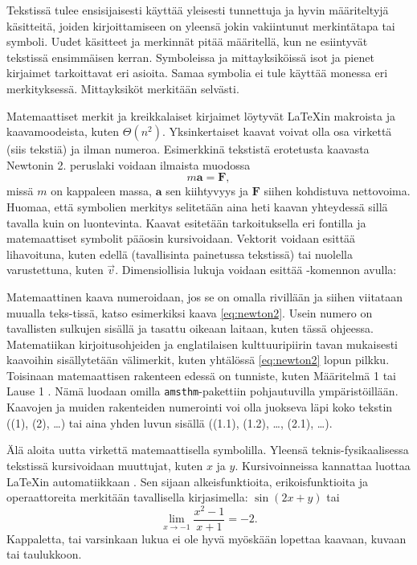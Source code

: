 Tekstissä tulee ensisijaisesti käyttää yleisesti tunnettuja ja hyvin määriteltyjä käsitteitä, joiden kirjoittamiseen on yleensä jokin vakiintunut merkintätapa tai symboli. Uudet käsitteet ja merkinnät pitää määritellä, kun ne esiintyvät tekstissä ensimmäisen kerran. Symboleissa ja mittayksiköissä isot ja pienet kirjaimet tarkoittavat eri asioita. Samaa symbolia ei tule käyttää monessa eri merkityksessä. Mittayksiköt merkitään selvästi.

Matemaattiset merkit ja kreikkalaiset kirjaimet löytyvät \LaTeX{}in makroista ja kaavamoodeista, kuten \(\Theta(n^2)\). Yksinkertaiset kaavat voivat olla osa virkettä (siis tekstiä) ja ilman numeroa. Esimerkkinä tekstistä erotetusta kaavasta Newtonin 2. peruslaki voidaan ilmaista muodossa
\begin{equation}\label{eq:newton2}
    m\mathbf{a} = \mathbf{F},
\end{equation}
missä \(m\) on kappaleen massa, \(\mathbf{a}\) sen kiihtyvyys ja \(\mathbf{F}\) siihen kohdistuva nettovoima. Huomaa, että symbolien merkitys selitetään aina heti kaavan yhteydessä sillä tavalla kuin on luontevinta. Kaavat esitetään tarkoituksella eri fontilla ja matemaattiset symbolit pääosin kursivoidaan. Vektorit voidaan esittää lihavoituna, kuten edellä (tavallisinta painetussa tekstissä) tai nuolella varustettuna, kuten \(\vec{v}\). Dimensiollisia lukuja voidaan esittää -komennon avulla:

Matemaattinen kaava numeroidaan, jos se on omalla rivillään ja siihen viitataan muualla teks-tissä, katso esimerkiksi kaava \eqref{eq:newton2}. Usein numero on tavallisten sulkujen sisällä ja tasattu oikeaan laitaan, kuten tässä ohjeessa. Matematiikan kirjoitusohjeiden ja englatilaisen kulttuuripiirin tavan mukaisesti kaavoihin sisällytetään välimerkit, kuten yhtälössä \eqref{eq:newton2} lopun pilkku. Toisinaan matemaattisen rakenteen edessä on tunniste, kuten Määritelmä 1 tai Lause 1 \parencite{matohje2009}. Nämä luodaan omilla \texttt{amsthm}-pakettiin pohjautuvilla ympäristöillään. Kaavojen ja muiden rakenteiden numerointi voi olla juokseva läpi koko tekstin ((1), (2), \ldots) tai aina yhden luvun sisällä ((1.1), (1.2), \ldots, (2.1), \ldots).

Älä aloita uutta virkettä matemaattisella symbolilla. Yleensä teknis-fysikaalisessa tekstissä kursivoidaan muuttujat, kuten \(x\) ja \(y\). Kursivoinneissa kannattaa luottaa \LaTeX{}in automatiikkaan \parencite{notsoshort}. Sen sijaan alkeisfunktioita, erikoisfunktioita ja operaattoreita merkitään tavallisella kirjasimella: \(\sin(2x + y)\) tai
\begin{equation*}
    \lim_{x \rightarrow -1}\frac{x^2 - 1}{x + 1} = -2.
\end{equation*}
Kappaletta, tai varsinkaan lukua ei ole hyvä myöskään lopettaa kaavaan, kuvaan tai taulukkoon.

